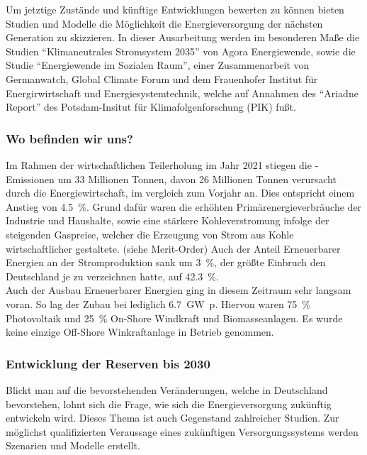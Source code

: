 		Um jetztige Zustände und künftige Entwicklungen bewerten zu können bieten Studien und Modelle die Möglichkeit die Energieversorgung der nächsten Generation zu skizzieren. In dieser Ausarbeitung werden im besonderen Maße die Studien "`Klimaneutrales Stromsystem 2035"' von Agora Energiewende, sowie die Studie "`Energiewende im Sozialen Raum"', einer Zusammenarbeit von Germanwatch, Global Climate Forum und dem Frauenhofer Institut für Energirwirtschaft und Energiesystemtechnik, welche auf Annahmen des "`Ariadne Report"' des Potsdam-Insitut für Klimafolgenforschung (PIK) fußt.\\

		\subsubsection{Wo befinden wir uns?}
		Im Rahmen der wirtschaftlichen Teilerholung im Jahr 2021 stiegen die \SI{}{\COtwo}-Emissionen um 33 Millionen Tonnen, davon 26 Millionen Tonnen verursacht durch die Energiewirtschaft, im vergleich zum Vorjahr an. Dies entspricht einem Anstieg von \SI{4,5}{\percent}.\cite[S.5]{Stand_der_Dinge} Grund dafür waren die erhöhten Primärenergieverbräuche der Industrie und Haushalte, sowie eine stärkere Kohleverstromung infolge der steigenden Gaspreise, welcher die Erzeugung von Strom aus Kohle wirtschaftlicher gestaltete. (siehe Merit-Order) Auch der Anteil Erneuerbarer Energien an der Stromproduktion sank um \SI{3}{\percent}, der größte Einbruch den Deutschland je zu verzeichnen hatte, auf \SI{42,3}{\percent}.\cite[S.5]{Stand_der_Dinge}\\
		
		Auch der Ausbau Erneuerbarer Energien ging in diesem Zeitraum sehr langsam voran. So lag der Zubau bei lediglich \SI{6,7}{\giga \watt p}. Hiervon waren \SI{75}{\percent} Photovoltaik und \SI{25}{\percent} On-Shore Windkraft und Biomasseanlagen. Es wurde keine einzige Off-Shore Winkraftanlage in Betrieb genommen. \cite[S.47 ff.]{Stand_der_Dinge}
		
		
		\subsubsection{Entwicklung der Reserven bis 2030} \label{sect: 2030}
		Blickt man auf die bevorstehenden Veränderungen, welche in Deutschland bevorstehen, lohnt sich die Frage, wie sich die Energieversorgung zukünftig entwickeln wird. Dieses Thema ist auch Gegenstand zahlreicher Studien. Zur möglichst qualifizierten Veraussage eines zukünftigen Versorgungssystems werden Szenarien und Modelle erstellt.\\
		
